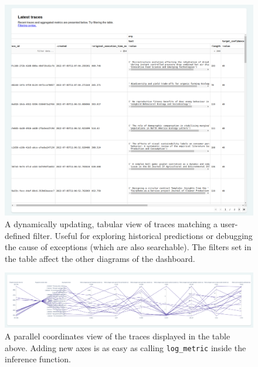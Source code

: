 \begin{figure}
    \centering
    \includegraphics[width=1\textwidth]{figures/greatai-table.png}
    \captionsetup{width=.9\linewidth}
    \caption{A dynamically updating, tabular view of traces matching a user-defined filter. Useful for exploring historical predictions or debugging the cause of exceptions (which are also searchable). The filters set in the table affect the other diagrams of the dashboard.}
    \label{fig:greatai-table}
\end{figure}

\begin{figure}
    \centering
    \includegraphics[width=1\textwidth]{figures/greatai-parallel.png}
    \captionsetup{width=.9\linewidth}
    \caption{A parallel coordinates view of the traces displayed in the table above. Adding new axes is as easy as calling \texttt{log\_metric} inside the inference function.}
    \label{fig:greatai-parallel}
\end{figure}
